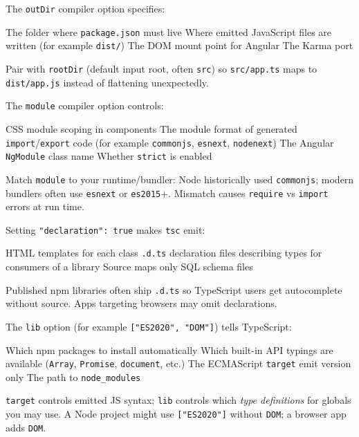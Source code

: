 \question[4]
The \texttt{outDir} compiler option specifies:
\begin{choices}
  \choice The folder where \texttt{package.json} must live
  \CorrectChoice Where emitted JavaScript files are written (for example \texttt{dist/})
  \choice The DOM mount point for Angular
  \choice The Karma port
\end{choices}
\begin{solution}
  Pair with \texttt{rootDir} (default input root, often \texttt{src}) so \texttt{src/app.ts} maps to \texttt{dist/app.js} instead of flattening unexpectedly.
\end{solution}

\question[4]
The \texttt{module} compiler option controls:
\begin{choices}
  \choice CSS module scoping in components
  \CorrectChoice The module format of generated \texttt{import}/\texttt{export} code (for example \texttt{commonjs}, \texttt{esnext}, \texttt{nodenext})
  \choice The Angular \texttt{NgModule} class name
  \choice Whether \texttt{strict} is enabled
\end{choices}
\begin{solution}
  Match \texttt{module} to your runtime/bundler: Node historically used \texttt{commonjs}; modern bundlers often use \texttt{esnext} or \texttt{es2015}+. Mismatch causes \texttt{require} vs \texttt{import} errors at run time.
\end{solution}

\question[4]
Setting \texttt{"declaration": true} makes \texttt{tsc} emit:
\begin{choices}
  \choice HTML templates for each class
  \CorrectChoice \texttt{.d.ts} declaration files describing types for consumers of a library
  \choice Source maps only
  \choice SQL schema files
\end{choices}
\begin{solution}
  Published npm libraries often ship \texttt{.d.ts} so TypeScript users get autocomplete without source. Apps targeting browsers may omit declarations.
\end{solution}

\question[4]
The \texttt{lib} option (for example \texttt{["ES2020", "DOM"]}) tells TypeScript:
\begin{choices}
  \choice Which npm packages to install automatically
  \CorrectChoice Which built-in API typings are available (\texttt{Array}, \texttt{Promise}, \texttt{document}, etc.)
  \choice The ECMAScript \texttt{target} emit version only
  \choice The path to \texttt{node\_modules}
\end{choices}
\begin{solution}
  \texttt{target} controls emitted JS syntax; \texttt{lib} controls which \emph{type definitions} for globals you may use. A Node project might use \texttt{["ES2020"]} without \texttt{DOM}; a browser app adds \texttt{DOM}.
\end{solution}

